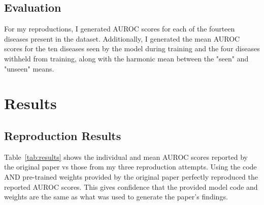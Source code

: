 \documentclass[letterpaper]{article} %
\begin{document}
\subsection{Evaluation}

For my reproductions, I generated AUROC scores for each of the fourteen diseases present in the dataset. Additionally, I generated the mean AUROC scores for the ten diseases seen by the model during training and the four diseases withheld from training, along with the harmonic mean between the "seen" and "unseen" means.

\section{Results}

\subsection{Reproduction Results}

Table~\ref{tab:results} shows the individual and mean AUROC scores reported by the original paper vs those from my three reproduction attempts. Using the code AND pre-trained weights provided by the original paper perfectly reproduced the reported AUROC scores. This gives confidence that the provided model code and weights are the same as what was used to generate the paper's findings.
\end{document}
